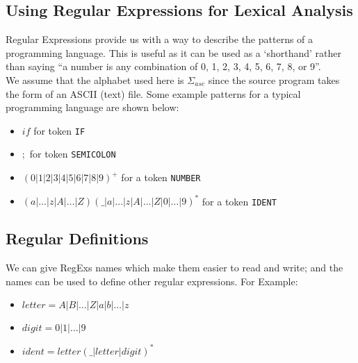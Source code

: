 \subsection{Using Regular Expressions for Lexical Analysis}
Regular Expressions provide us with a way to describe the patterns of a programming language. This is useful as it can be used as a `shorthand' rather than saying ``a number is any combination of 0, 1, 2, 3, 4, 5, 6, 7, 8, or 9''.\\

We assume that the alphabet used here is $\Sigma_{asc}$ since the source program takes the form of an ASCII (text) file. Some example patterns for a typical programming language are shown below:
\begin{itemize}
    \item $if$ for token \verb|IF|
    \item $;$ for token \verb|SEMICOLON|
    \item $(0|1|2|3|4|5|6|7|8|9)^+$ for a token \verb|NUMBER|
    \item $(a|\ldots|z|A|\ldots|Z)(\_|a|\ldots|z|A|\ldots|Z|0|\ldots|9)^*$ for a token \verb|IDENT|
\end{itemize}

\subsection{Regular Definitions}
We can give RegExs names which make them easier to read and write; and the names can be used to define other regular expressions. For Example:
\begin{itemize}
    \item $letter = A|B|\ldots|Z|a|b|\ldots|z$
    \item $digit = 0|1|\ldots|9$
    \item $ident = letter(\_|letter|digit)^*$
\end{itemize}

